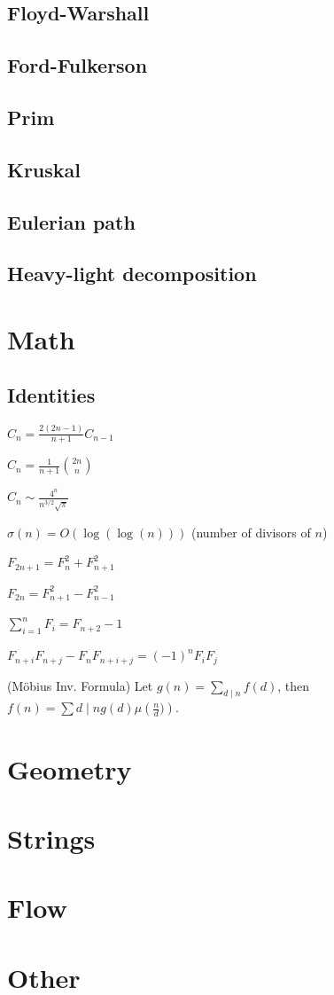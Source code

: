 \subsection{ Floyd-Warshall }
\subsection{ Ford-Fulkerson }
\subsection{ Prim }
\subsection{ Kruskal }
\subsection{ Eulerian path }
\subsection{ Heavy-light decomposition }

\section{Math}
\subsection{Identities}
{
	$C_n = \frac{2(2n-1)}{n+1} C_{n-1}$

	$C_n = \frac{1}{n+1} \binom{2n}{n}$

	$C_n \sim \frac{4^n}{n^{3/2}\sqrt{\pi}}$

	$\sigma(n) = O(\log(\log(n)))$ (number of divisors of $n$)

	$F_{2n+1} = F_{n}^2 + F_{n+1}^2$

	$F_{2n} = F_{n+1}^2 - F_{n-1}^2$

	$\sum_{i=1}^n F_i = F_{n+2}-1$

	$F_{n+i}F_{n+j} - F_nF_{n+i+j} = (-1)^n F_iF_j$

	(Möbius Inv. Formula)
	Let $g(n) = \sum_{d\mid n} f(d)$, then $f(n)=\sum{d\mid n} g(d) \mu\left(\frac{n}{d})\right)$.
}

\section{Geometry}
\section{Strings}

\section{Flow}

\section{Other}

